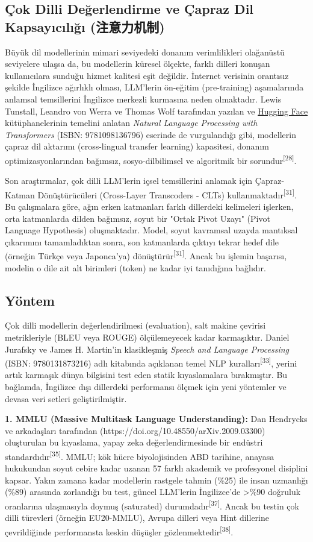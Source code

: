 \documentclass[11pt,a4paper]{article}
\begin{document}
\subsection{Çok Dilli Değerlendirme ve Çapraz Dil Kapsayıcılığı (注意力机制)}
Büyük dil modellerinin mimari seviyedeki donanım verimlilikleri olağanüstü seviyelere ulaşsa da, bu modellerin küresel ölçekte, farklı dilleri konuşan kullanıcılara sunduğu hizmet kalitesi eşit değildir. İnternet verisinin orantısız şekilde İngilizce ağırlıklı olması, LLM'lerin ön-eğitim (pre-training) aşamalarında anlamsal temsillerini İngilizce merkezli kurmasına neden olmaktadır. Lewis Tunstall, Leandro von Werra ve Thomas Wolf tarafından yazılan ve \href{https://huggingface.co}{Hugging Face} kütüphanelerinin temelini anlatan \textit{Natural Language Processing with Transformers} (ISBN: 9781098136796) eserinde de vurgulandığı gibi, modellerin çapraz dil aktarımı (cross-lingual transfer learning) kapasitesi, donanım optimizasyonlarından bağımsız, sosyo-dilbilimsel ve algoritmik bir sorundur\textsuperscript{[28]}.

Son araştırmalar, çok dilli LLM'lerin içsel temsillerini anlamak için Çapraz-Katman Dönüştürücüleri (Cross-Layer Transcoders - CLTs) kullanmaktadır\textsuperscript{[31]}. Bu çalışmalara göre, ağın erken katmanları farklı dillerdeki kelimeleri işlerken, orta katmanlarda dilden bağımsız, soyut bir "Ortak Pivot Uzayı" (Pivot Language Hypothesis) oluşmaktadır. Model, soyut kavramsal uzayda mantıksal çıkarımını tamamladıktan sonra, son katmanlarda çıktıyı tekrar hedef dile (örneğin Türkçe veya Japonca'ya) dönüştürür\textsuperscript{[31]}. Ancak bu işlemin başarısı, modelin o dile ait alt birimleri (token) ne kadar iyi tanıdığına bağlıdır.

\subsection{Yöntem}
Çok dilli modellerin değerlendirilmesi (evaluation), salt makine çevirisi metrikleriyle (BLEU veya ROUGE) ölçülemeyecek kadar karmaşıktır. Daniel Jurafsky ve James H. Martin'in klasikleşmiş \textit{Speech and Language Processing} (ISBN: 9780131873216) adlı kitabında açıklanan temel NLP kuralları\textsuperscript{[33]}, yerini artık karmaşık dünya bilgisini test eden statik kıyaslamalara bırakmıştır. Bu bağlamda, İngilizce dışı dillerdeki performansı ölçmek için yeni yöntemler ve devasa veri setleri geliştirilmiştir.

\textbf{1. MMLU (Massive Multitask Language Understanding):} Dan Hendrycks ve arkadaşları tarafından (https://doi.org/10.48550/arXiv.2009.03300) oluşturulan bu kıyaslama, yapay zeka değerlendirmesinde bir endüstri standardıdır\textsuperscript{[35]}. MMLU; kök hücre biyolojisinden ABD tarihine, anayasa hukukundan soyut cebire kadar uzanan 57 farklı akademik ve profesyonel disiplini kapsar. Yakın zamana kadar modellerin rastgele tahmin (\%25) ile insan uzmanlığı (\%89) arasında zorlandığı bu test, güncel LLM'lerin İngilizce'de >\%90 doğruluk oranlarına ulaşmasıyla doymuş (saturated) durumdadır\textsuperscript{[37]}. Ancak bu testin çok dilli türevleri (örneğin EU20-MMLU), Avrupa dilleri veya Hint dillerine çevrildiğinde performansta keskin düşüşler gözlenmektedir\textsuperscript{[38]}.
\end{document}
